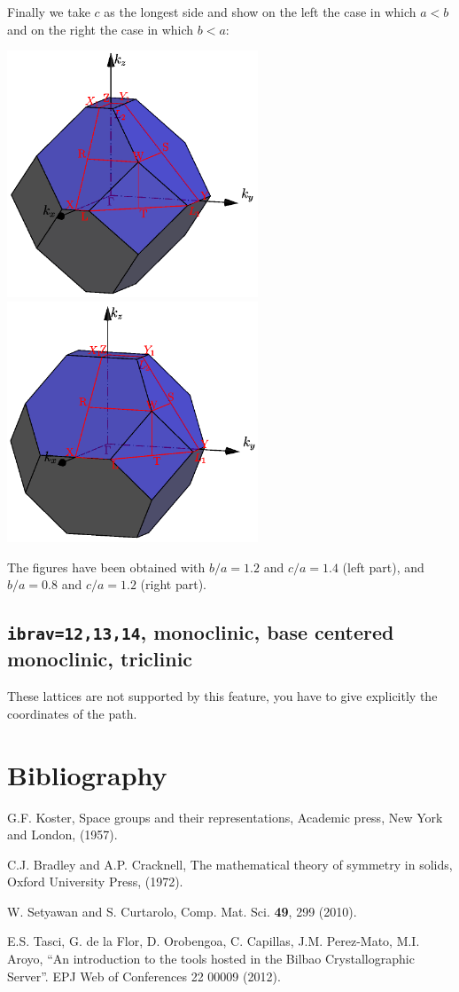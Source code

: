 \documentclass[12pt,a4paper]{article}
\begin{document}
Finally we take $c$ as the longest side and show on the left the case in 
which $a<b$ and on the right the case in which $b<a$:
\begin{center}
\includegraphics[width=7.5cm,angle=0]{images/bco_1.png} \hspace{1.0 cm}
\includegraphics[width=7.5cm,angle=0]{images/bco_6.png}
\end{center}
The figures have been obtained with $b/a=1.2$ and $c/a=1.4$ (left part), and
$b/a=0.8$ and $c/a=1.2$ (right part).

\subsection{\texttt{ibrav=12,13,14}, monoclinic, base centered monoclinic,
triclinic}
These lattices are not supported by this feature, you have to give
explicitly the coordinates of the path.

\section{Bibliography}

\noindent [1] G.F. Koster, Space groups and their representations, Academic press,
New York and London, (1957). 

\noindent [2] C.J. Bradley and A.P. Cracknell, The mathematical theory of symmetry
in solids, Oxford University Press, (1972).

\noindent [3] W. Setyawan and S. Curtarolo, Comp. Mat. Sci.  {\bf 49}, 299 (2010).

\noindent [4] E.S. Tasci, G. de la Flor, D. Orobengoa, C. Capillas, 
J.M. Perez-Mato, M.I. Aroyo, ``An introduction to the tools hosted in the 
Bilbao Crystallographic Server''. EPJ Web of Conferences 22 00009 (2012).
\end{document}
